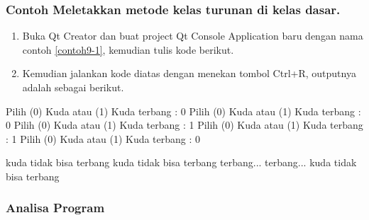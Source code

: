 \subsubsection*{Contoh Meletakkan metode kelas turunan di kelas dasar.}

\begin{enumerate}

\item
 Buka Qt Creator dan buat project Qt Console Application baru dengan
 nama contoh \ref{contoh9-1}, kemudian tulis kode berikut.




\item
 Kemudian jalankan kode diatas dengan menekan tombol Ctrl+R, outputnya
 adalah sebagai berikut.
\end{enumerate}

\begin{lcverbatim}
Pilih (0) Kuda atau (1) Kuda terbang : 0
Pilih (0) Kuda atau (1) Kuda terbang : 0
Pilih (0) Kuda atau (1) Kuda terbang : 1
Pilih (0) Kuda atau (1) Kuda terbang : 1
Pilih (0) Kuda atau (1) Kuda terbang : 0

kuda tidak bisa terbang
kuda tidak bisa terbang
terbang...
terbang...
kuda tidak bisa terbang
\end{lcverbatim}

\subsubsection*{Analisa Program}

